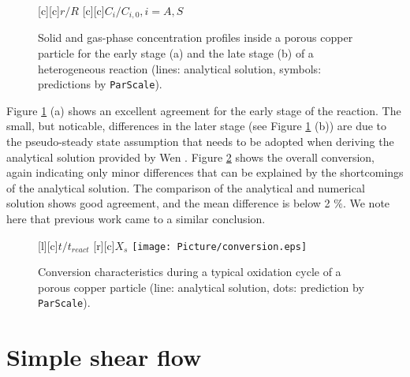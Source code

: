 \documentclass{particles2015}
\begin{document}
\begin{figure}[h!]
\centering
		{$r/R$}
   	[c][c]{$C_i / C_{i,0} , i=A,S$}
\hspace{0.3cm}
\\
\caption{Solid and gas-phase concentration profiles inside a porous copper particle for the early stage (a) and the late stage (b) of a heterogeneous reaction (lines: analytical solution, symbols: predictions by \texttt{ParScale}).}
\label{fig:reaction_stages}
\end{figure}

Figure \ref{fig:reaction_stages} (a) shows an excellent agreement for the early stage of the reaction. The small, but noticable, differences in the later stage (see Figure \ref{fig:reaction_stages} (b)) are due to the pseudo-steady state assumption that needs to be adopted when deriving the analytical solution provided by Wen \cite{Wen}. Figure \ref{fig:Conversion} shows the overall conversion, again indicating only minor differences that can be explained by the shortcomings of the analytical solution. The comparison of the analytical and numerical solution shows good agreement, and the mean difference is below 2 $\%$. We note here that previous work \cite{Noorman2011} came to a similar conclusion. 

\begin{figure}[h!]
   \centering
   	[l][c]{$t / t_{react}$}
   	[r][c]{$X_s$}
   \texttt{[image: Picture/conversion.eps]}
   \caption{Conversion characteristics during a typical oxidation cycle of a porous copper particle (line: analytical solution, dots: prediction by \texttt{ParScale}).}
   \label{fig:Conversion}
\end{figure}


\newpage
\section{Simple shear flow}
\label{sec:simple_shear}
\end{document}

